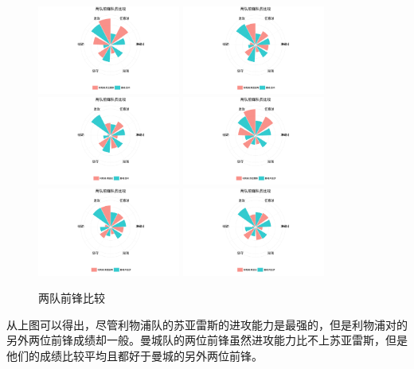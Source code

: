 \documentclass[12pt,a4paper,onecolumn]{article}
\begin{document}
\begin{figure}[H]
\centering
\includegraphics[width=133pt]{前锋94115.pdf}
\includegraphics[width=133pt]{前锋94144.pdf}
\includegraphics[width=133pt]{前锋94161.pdf}
\includegraphics[width=133pt]{前锋128115.pdf}
\includegraphics[width=133pt]{前锋128144.pdf}
\includegraphics[width=133pt]{前锋128161.pdf}
\caption{\small{两队前锋比较}}
\end{figure}

从上图可以得出，尽管利物浦队的苏亚雷斯的进攻能力是最强的，但是利物浦对的另外两位前锋成绩却一般。曼城队的两位前锋虽然进攻能力比不上苏亚雷斯，但是他们的成绩比较平均且都好于曼城的另外两位前锋。
\end{document}
